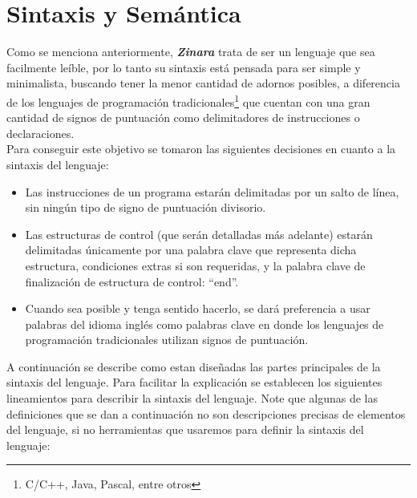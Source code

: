 \documentclass[12pt, spanish]{report}
\begin{document}
\section{Sintaxis y Sem\'antica}
\label{sec:synsem}

Como se menciona anteriormente, \emph{\textbf{Zinara}} trata de ser un
lenguaje que sea facilmente le\'ible, por lo tanto su sintaxis est\'a
pensada para ser simple y minimalista, buscando tener la menor
cantidad de adornos posibles, a diferencia de los lenguajes de
programaci\'on tradicionales\footnote{C/C++, Java, Pascal, entre otros}
que cuentan con una gran cantidad de signos de puntuaci\'on como
delimitadores de instrucciones o declaraciones.\\

Para conseguir este objetivo se tomaron las siguientes decisiones en
cuanto a la sintaxis del lenguaje:

\begin{itemize}
\item Las instrucciones de un programa estar\'an delimitadas por un
  salto de l\'inea, sin ning\'un tipo de signo de puntuaci\'on divisorio.

\item Las estructuras de control (que ser\'an detalladas m\'as adelante)
  estar\'an delimitadas \'unicamente por una palabra clave que representa
  dicha estructura, condiciones extras si son requeridas, y la palabra
  clave de finalizaci\'on de estructura de control: ``end''.

\item Cuando sea posible y tenga sentido hacerlo, se dar\'a preferencia
  a usar palabras del idioma ingl\'es como palabras clave en donde los
  lenguajes de programaci\'on tradicionales utilizan signos de
  puntuaci\'on.
\end{itemize}

A continuaci\'on se describe como estan dise\~nadas las partes principales
de la sintaxis del lenguaje. Para facilitar la explicaci\'on se
establecen los siguientes lineamientos para describir la sintaxis del
lenguaje. Note que algunas de las definiciones que se dan a
continuaci\'on no son descripciones precisas de elementos del lenguaje,
si no herramientas que usaremos para definir la sintaxis del lenguaje:
\end{document}
